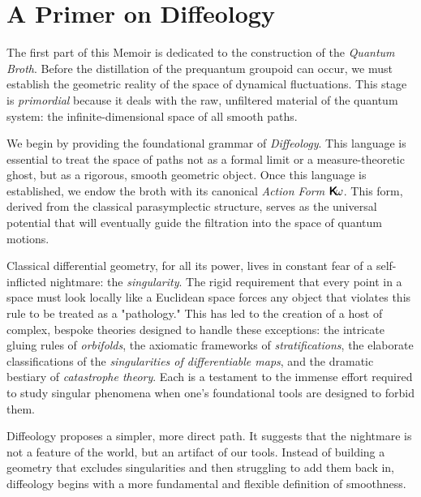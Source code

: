   \chapter{A Primer on Diffeology}
  \label{chap:A Primer on Diffeology}
  
  The first part of this Memoir is dedicated to the construction of the \emph{Quantum Broth}.
  Before the distillation of the prequantum groupoid can occur,
  we must establish the geometric reality of the space of dynamical fluctuations.
  This stage is \emph{primordial} because it deals with the raw,
  unfiltered material of the quantum system:
  the infinite-dimensional space of all smooth paths.
  
  We begin by providing the foundational grammar of \emph{Diffeology}.
  This language is essential to treat the space of paths not as a formal limit or a measure-theoretic ghost,
  but as a rigorous,
  smooth geometric object.
  Once this language is established,
  we endow the broth with its canonical \emph{Action Form} $\boldsymbol{\mathsf{K}}\!\omega$.
  This form,
  derived from the classical parasymplectic structure,
  serves as the universal potential that will eventually guide the filtration into the space of quantum motions.
  
  Classical differential geometry,
  for all its power,
  lives in constant fear of a self-inflicted nightmare:
  the \emph{singularity}.
  The rigid requirement that every point in a space must look locally like a Euclidean space forces any object that violates this rule to be treated as a "pathology."
  This has led to the creation of a host of complex,
  bespoke theories designed to handle these exceptions:
  the intricate gluing rules of \emph{orbifolds},
  the axiomatic frameworks of \emph{stratifications},
  the elaborate classifications of the \emph{singularities of differentiable maps},
  and the dramatic bestiary of \emph{catastrophe theory}.
  Each is a testament to the immense effort required to study singular phenomena when one's foundational tools are designed to forbid them.
  
  Diffeology proposes a simpler,
  more direct path.
  It suggests that the nightmare is not a feature of the world,
  but an artifact of our tools.
  Instead of building a geometry that excludes singularities and then struggling to add them back in,
  diffeology begins with a more fundamental and flexible definition of smoothness.
  
